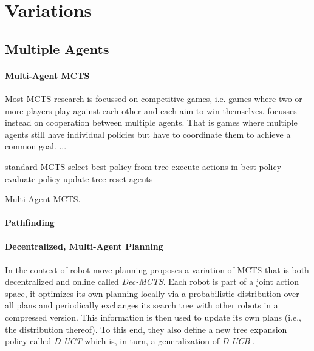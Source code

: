 \section{Variations}
\label{sec:variations}
\subsection{Multiple Agents}
\paragraph{Multi-Agent MCTS}
Most MCTS research is focussed on competitive games, i.e. games where two or more players play against each other and each aim to win themselves. \cite{zerbel2019multiagent} focusses instead on cooperation between multiple agents. That is games where multiple agents still have individual policies but have to coordinate them to achieve a common goal. ... 

\begin{algorithm}[htbp]
\begin{algorithmic}
\State standard MCTS
\EndFor
{}
\State select best policy from tree
\State execute actions in best policy
\EndFor
{}
\State evaluate policy
\State update tree
\EndFor
\State reset agents
\EndFor
\end{algorithmic}
\caption{Multi-Agent MCTS.}
\label{alg:mamcts}
\end{algorithm}

\paragraph{Pathfinding}
\cite{kiarostami2019multi}
\paragraph{Decentralized, Multi-Agent Planning}
In the context of robot move planning \cite{best2019dec} proposes a variation of MCTS that is both decentralized and online called \textit{Dec-MCTS}. Each robot is part of a joint action space, it optimizes its own planning locally via a probabilistic distribution over all plans and periodically exchanges its search tree with other robots in a compressed version. This information is then used to update its own plans (i.e., the distribution thereof). To this end, they also define a new tree expansion policy called \textit{D-UCT} which is, in turn, a generalization of \textit{D-UCB} \cite{garivier2011upper}.

